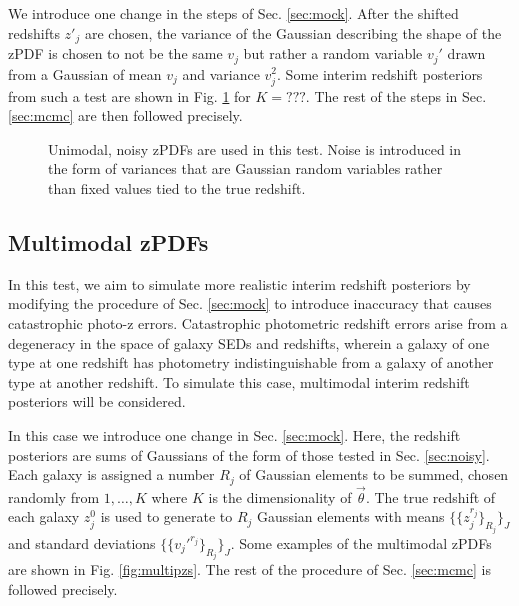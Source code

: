 \documentclass[preprint]{aastex}
\begin{document}
We introduce one change in the steps of Sec. \ref{sec:mock}.  After the shifted 
redshifts $z'_{j}$ are chosen, the variance of the Gaussian describing the 
shape of the zPDF is chosen to not be the same $v_{j}$ but rather a random 
variable $v_{j}'$ drawn from a Gaussian of mean $v_{j}$ and variance 
$v_{j}^{2}$.  Some interim redshift posteriors from such a test are shown in 
Fig. \ref{fig:noisypzs} for $K=???$.  The rest of the steps in Sec. 
\ref{sec:mcmc} are then followed precisely.

\begin{figure}
\caption{Unimodal, noisy zPDFs are used in this test.  Noise is introduced in 
the form of variances that are Gaussian random variables rather than fixed 
values tied to the true redshift.}
\label{fig:noisypzs}
\end{figure}


\clearpage
\subsection{Multimodal zPDFs}
\label{sec:multi}

In this test, we aim to simulate more realistic interim redshift posteriors by 
modifying the procedure of Sec. \ref{sec:mock} to introduce inaccuracy that 
causes catastrophic photo-z errors.  Catastrophic photometric redshift errors 
arise from a degeneracy in the space of galaxy SEDs and redshifts, wherein a 
galaxy of one type at one redshift has photometry indistinguishable from a 
galaxy of another type at another redshift.  To simulate this case, multimodal 
interim redshift posteriors will be considered.

In this case we introduce one change in Sec. \ref{sec:mock}.  Here, the 
redshift posteriors are sums of Gaussians of the form of those tested in Sec. 
\ref{sec:noisy}.  Each galaxy is assigned a number $R_{j}$ of Gaussian elements 
to be summed, chosen randomly from $1,\dots,K$ where $K$ is the dimensionality 
of $\vec{\theta}$.  The true redshift of each galaxy $z_{j}^{0}$ is used to 
generate to $R_{j}$ Gaussian elements with means 
$\{\{z_{j}^{r_{j}}\}_{R_{j}}\}_{J}$ and standard deviations 
$\{\{v_{j}'^{r_{j}}\}_{R_{j}}\}_{J}$.  Some examples of the multimodal zPDFs 
are shown in Fig. \ref{fig:multipzs}.  The rest of the procedure of Sec. 
\ref{sec:mcmc} is followed precisely.
\end{document}

